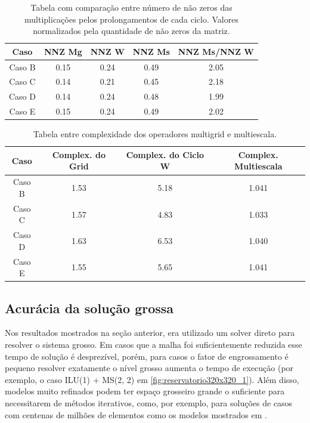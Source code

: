 \begin{table}[]
\centering
\caption{Tabela com comparação entre número de não zeros das multiplicações pelos prolongamentos de cada ciclo. Valores normalizados pela quantidade de não zeros da matriz.} \label{tab:comparacaoMsxMgProlongamento}
\begin{tabular}{|c|c|c|c|c|}
\hline
\textbf{Caso} & \textbf{NNZ Mg} & \textbf{NNZ W} & \textbf{NNZ Ms} & \textbf{NNZ Ms/NNZ W} \\ \hline
Caso B & 0.15 & 0.24 & 0.49 & 2.05 \\ \hline
Caso C & 0.14 & 0.21 & 0.45 & 2.18 \\ \hline
Caso D & 0.14 & 0.24 & 0.48 & 1.99 \\ \hline
Caso E & 0.15 & 0.24 & 0.49 & 2.02 \\ \hline
\end{tabular}
\end{table}




\begin{table}[]
\centering
\caption{Tabela entre complexidade dos operadores multigrid e multiescala.} \label{tab:comparacaoMsxMgComplexidade}
\begin{tabular}{|c|c|c|c|}
\hline
\textbf{Caso} & \textbf{Complex. do Grid} & \textbf{Complex. do Ciclo W} & \textbf{Complex. Multiescala} \\ \hline
Caso B        & 1.53                          & 5.18                           & 1.041                             \\ \hline
Caso C        & 1.57                          & 4.83                           & 1.033                             \\ \hline
Caso D        & 1.63                          & 6.53                           & 1.040                             \\ \hline
Caso E        & 1.55                          & 5.65                           & 1.041                             \\ \hline
\end{tabular}
\end{table}

\subsection{Acurácia da solução grossa}

Nos resultados mostrados na seção anterior, era utilizado um solver direto para resolver o sistema grosso. Em casos que a malha foi suficientemente reduzida esse tempo de solução é desprezível, porém, para casos o fator de engrossamento é pequeno resolver exatamente o nível grosso aumenta o tempo de execução (por exemplo, o caso ILU(1) + MS(2, 2) em \ref{fig:reservatorio320x320_1}). Além disso, modelos muito refinados podem ter espaço grosseiro grande o suficiente para necessitarem de  métodos iterativos, como, por exemplo, para soluções de casos com centenas de milhões de elementos como os modelos mostrados em \cite{geomecrio}.

